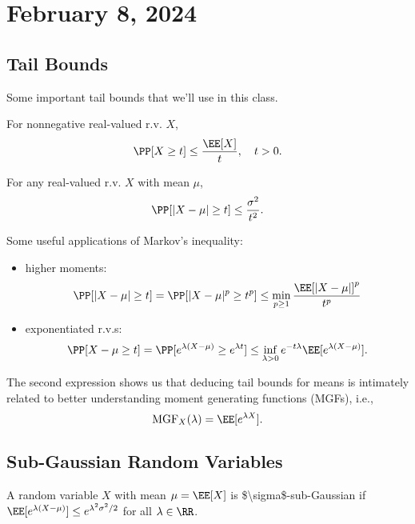 \section{February 8, 2024}

\subsection{Tail Bounds}

Some important tail bounds that we'll use in this class.

\begin{theorem}

For nonnegative real-valued r.v. $X$,
\[\PP[X \geq t]\leq \frac{\EE[X]}{t}, \quad t > 0.\] 
\end{theorem}

\begin{theorem}

For any real-valued r.v. $X$ with mean $\mu$, 
\[\PP[\vert X-\mu\vert \geq t]\leq \frac{\sigma^2}{t^2}.\] 
\end{theorem}

\noindent Some useful applications of Markov's inequality: 
\begin{itemize}
	\item higher moments: 
		\[\PP[\vert X-\mu\vert\geq t] = \PP[\vert X-\mu\vert^p \geq t^p] \leq \min_{p\geq 1}\frac{\EE[\vert X-\mu\vert]^p}{t^p}\] 
	\item exponentiated r.v.s: 
	\[\PP[X - \mu\geq t] = \PP[e^{\lambda(X-\mu)}\geq e^{\lambda t}] \leq \inf_{\lambda > 0}e^{-t\lambda} \EE[e^{\lambda(X-\mu)}].\] 
\end{itemize}
The second expression shows us that deducing tail bounds for means is intimately related to better understanding \ac{moment generating functions} (MGFs), i.e., 
\[\text{MGF}_X(\lambda) = \EE[e^{\lambda X}].\] 

\subsection{Sub-Gaussian Random Variables}

\begin{definition}

A random variable $X$ with mean $\mu = \EE[X]$ is \ac{$\sigma$-sub-Gaussian} if $\EE[e^{\lambda(X - \mu)}] \leq e^{\lambda^2\sigma^2 / 2}$ for all $\lambda\in \RR$. 
\end{definition}

